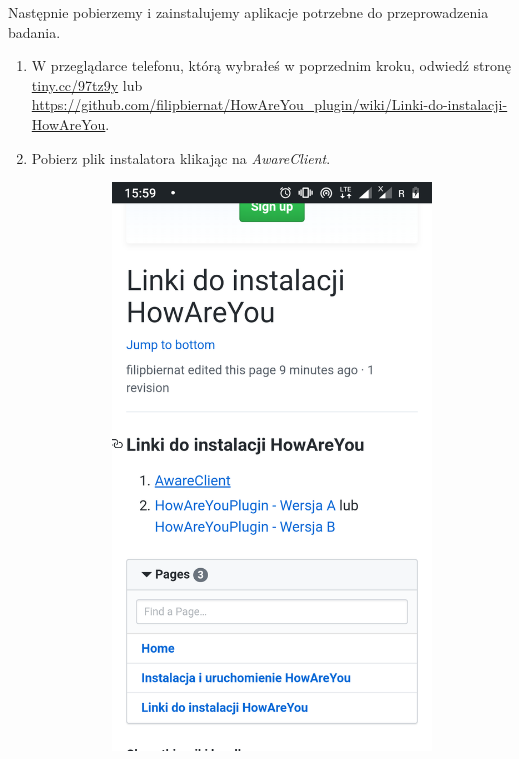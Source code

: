 Następnie pobierzemy i zainstalujemy aplikacje potrzebne do przeprowadzenia badania.

\begin{enumerate}
	
	\item W przeglądarce telefonu, którą wybrałeś w poprzednim kroku, odwiedź stronę \url{tiny.cc/97tz9y} lub \url{https://github.com/filipbiernat/HowAreYou_plugin/wiki/Linki-do-instalacji-HowAreYou}.
	
	\item Pobierz plik instalatora klikając na \textit{AwareClient}.
	
	\begin{figure}[H]
		\centering
		\begin{subfigure}{0.35\textwidth}
			\centering
			\includegraphics[scale=0.14]{dodatekA/2_1.png}

\end{subfigure}
\end{figure}
\end{enumerate}
